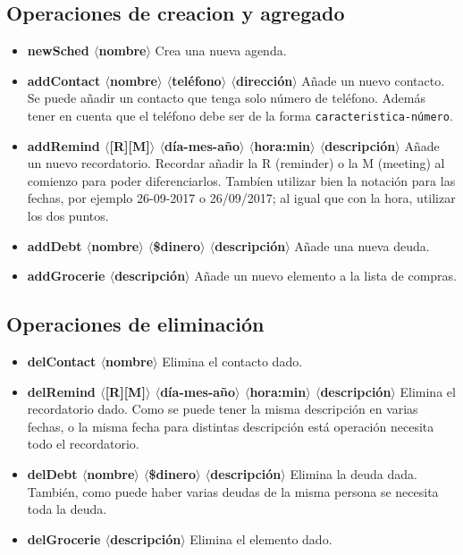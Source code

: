 \documentclass[a4paper,12pt]{article}
\begin{document}
    \subsection*{Operaciones de creacion y agregado}
    \begin{itemize}
      \item \textbf{newSched $\langle$nombre$\rangle$} Crea una nueva agenda.
      
      \item \textbf{addContact $\langle$nombre$\rangle$ $\langle$teléfono$\rangle$ $\langle$dirección$\rangle$}
        Añade un nuevo contacto. Se puede añadir un contacto que tenga solo número de teléfono. Además tener en cuenta que el teléfono debe ser de la forma \texttt{caracteristica-número}.
      
      \item \textbf{addRemind $\langle$[R][M]$\rangle$ $\langle$día-mes-año$\rangle$ $\langle$hora:min$\rangle$ $\langle$descripción$\rangle$} Añade un nuevo recordatorio. Recordar añadir la R (reminder) o la M (meeting) al comienzo para poder diferenciarlos. Tambíen utilizar bien la notación para las fechas, por ejemplo 26-09-2017 o 26/09/2017; al igual que con la hora, utilizar los dos puntos.

      \item \textbf{addDebt $\langle$nombre$\rangle$ $\langle$\$dinero$\rangle$ $\langle$descripción$\rangle$}
      Añade una nueva deuda.

      \item \textbf{addGrocerie $\langle$descripción$\rangle$} Añade un nuevo elemento a la lista de compras.
    \end{itemize}
    \subsection*{Operaciones de eliminación}
    \begin{itemize}  
      \item \textbf{delContact $\langle$nombre$\rangle$} Elimina el contacto dado.
      \item \textbf{delRemind $\langle$[R][M]$\rangle$ $\langle$día-mes-año$\rangle$ $\langle$hora:min$\rangle$ $\langle$descripción$\rangle$} Elimina el recordatorio dado. Como se puede tener la misma descripción en varias fechas, o la misma fecha para distintas descripción está operación necesita todo el recordatorio.

      \item \textbf{delDebt $\langle$nombre$\rangle$ $\langle$\$dinero$\rangle$ $\langle$descripción$\rangle$} Elimina la deuda dada. También, como puede haber varias deudas de la misma persona se necesita toda la deuda.

      \item \textbf{delGrocerie $\langle$descripción$\rangle$} Elimina el elemento dado.
    \end{itemize}
\end{document}

